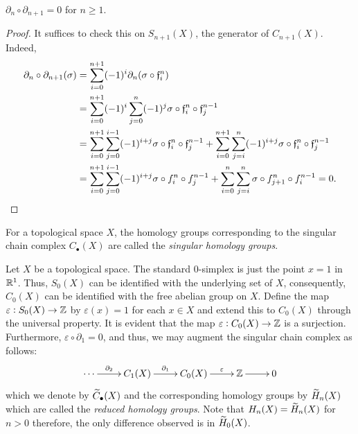 \begin{proposition}
    $\partial_n\circ\partial_{n + 1} = 0$ for $n\ge 1$.
\end{proposition}
\begin{proof}
    It suffices to check this on $S_{n + 1}(X)$, the generator of $C_{n + 1}(X)$. Indeed, 
    \begin{align*}
        \partial_n\circ\partial_{n + 1}(\sigma) &= \sum_{i = 0}^{n + 1}(-1)^i\partial_n(\sigma\circ\mathfrak f_i^{n})\\
        &= \sum_{i = 0}^{n + 1}(-1)^i\sum_{j = 0}^n(-1)^j\sigma\circ\mathfrak f_i^n\circ\mathfrak f_j^{n - 1}\\
        &= \sum_{i = 0}^{n + 1}\sum_{j = 0}^{i - 1}(-1)^{i + j}\sigma\circ\mathfrak f_i^n\circ\mathfrak f_j^{n - 1} + \sum_{i = 0}^{n + 1}\sum_{j = i}^{n}(-1)^{i + j}\sigma\circ\mathfrak f_i^n\circ\mathfrak f_j^{n - 1}\\
        &= \sum_{i = 0}^{n + 1}\sum_{j = 0}^{i - 1}(-1)^{i + j}\sigma\circ f_i^n\circ f_j^{n - 1} + \sum_{i = 0}^{n}\sum_{j = i}^{n}\sigma\circ f^n_{j + 1}\circ f_i^{n - 1} = 0\qedhere.
    \end{align*}
\end{proof}

\begin{definition}
    For a topological space $X$, the homology groups corresponding to the singular chain complex $C_\bullet(X)$ are called the \emph{singular homology groups}.
\end{definition}

\begin{mdframed}
    Let $X$ be a topological space. The standard $0$-simplex is just the point $x = 1$ in $\mathbb{R}^1$. Thus, $S_0(X)$ can be identified with the underlying set of $X$, consequently, $C_0(X)$ can be identified with the free abelian group on $X$. Define the map $\varepsilon: S_0(X)\to\mathbb{Z}$ by $\varepsilon(x) = 1$ for each $x\in X$ and extend this to $C_0(X)$ through the universal property. It is evident that the map $\varepsilon: C_0(X)\to\mathbb{Z}$ is a surjection. Furthermore, $\varepsilon\circ\partial_1 = 0$, and thus, we may augment the singular chain complex as follows: 
    \begin{equation*}
        \xymatrix {
            \cdots \ar[r]^-{\partial_2} & C_1(X)\ar[r]^-{\partial_1} & C_0(X)\ar[r]^-{\varepsilon} & \Z\ar[r] & 0
        }
    \end{equation*}
    which we denote by $\widetilde{C}_\bullet(X)$ and the corresponding homology groups by $\widetilde{H}_n(X)$ which are called the \emph{reduced homology groups}. Note that $H_n(X) = \widetilde{H}_n(X)$ for $n > 0$ therefore, the only difference observed is in $\widetilde{H}_0(X)$.
\end{mdframed}

